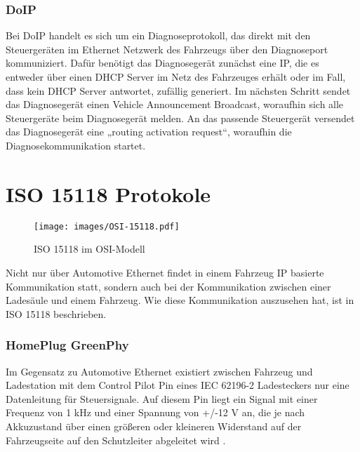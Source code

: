 
\subsubsection{DoIP}\label{subsec:doip}

Bei DoIP handelt es sich um ein Diagnoseprotokoll, das direkt mit den Steuergeräten im Ethernet Netzwerk des Fahrzeugs über den Diagnoseport kommuniziert.
Dafür benötigt das Diagnosegerät zunächst eine IP, die es entweder über einen DHCP Server im Netz des Fahrzeuges erhält oder im Fall, dass kein DHCP Server antwortet, zufällig generiert. 
Im nächsten Schritt sendet das Diagnosegerät einen Vehicle Announcement Broadcast, woraufhin sich alle Steuergeräte beim Diagnosegerät melden. An das passende Steuergerät versendet das Diagnosegerät eine „routing activation request“, woraufhin die Diagnosekommunikation startet\cite[]{doip}.

\section{ISO 15118 Protokole}\label{subsec:fahrzeugkommunikation}

\begin{figure}[H]
	\centering
	\texttt{[image: images/OSI-15118.pdf]}
	\caption{ISO 15118 im OSI-Modell}
	\label{fig:iso15118}
\end{figure}

Nicht nur über Automotive Ethernet findet in einem Fahrzeug IP basierte Kommunikation statt, sondern auch bei der Kommunikation zwischen einer Ladesäule und einem Fahrzeug. Wie diese Kommunikation auszusehen hat, ist in ISO 15118 beschrieben.  

\subsubsection{HomePlug GreenPhy}\label{subsec:homeplug}

Im Gegensatz zu Automotive Ethernet existiert zwischen Fahrzeug und Ladestation mit dem Control Pilot Pin eines IEC 62196-2 Ladesteckers nur eine Datenleitung für Steuersignale. Auf diesem Pin liegt ein Signal mit einer Frequenz von 1 kHz und einer Spannung von +/-12 V an, die je nach Akkuzustand über einen größeren oder kleineren Widerstand auf der Fahrzeugseite auf den Schutzleiter abgeleitet wird \cite[]{ladestecker}.


